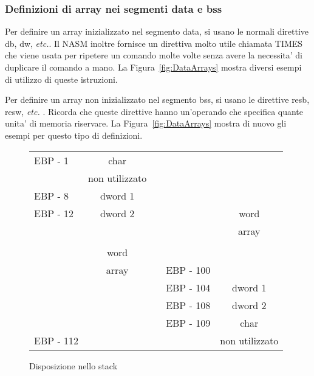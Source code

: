 \subsubsection{Definizioni di array nei segmenti {\code data} e {\code bss} 
               }

Per definire un array inizializzato nel segmento {\code data}, si usano
le normali direttive {\code db}, {\code dw}, \emph{etc.}.
Il NASM inoltre fornisce un direttiva molto utile chiamata {\code TIMES}  che viene usata per ripetere un comando molte volte
senza avere la necessita' di duplicare il comando a mano.
La Figura~\ref{fig:DataArrays} mostra diversi esempi di utilizzo di
queste istruzioni.   

Per definire un array non inizializzato nel segmento {\code bss}, si usano
le direttive {\code resb}, {\code resw}, \emph{etc.} .
Ricorda che queste direttive hanno un'operando che specifica quante
unita' di memoria riservare. La Figura~\ref{fig:DataArrays} mostra
di nuovo gli esempi per questo tipo di definizioni.

\begin{figure}[t]
\centering
\begin{tabular}{l|c|ll|c|}
\cline{2-2} \cline{5-5}
EBP - 1  & char    & \hspace{2em} &           & \\
\cline{2-2}
         & non utilizzato  &              &           & \\
\cline{2-2}
EBP - 8  & dword 1 &              &           & \\
\cline{2-2}
EBP - 12 & dword 2 &              &           & word \\
\cline{2-2}
         &         &              &           & array \\
         &         &              &           & \\
         & word    &              &           & \\
         & array   &              & EBP - 100 & \\
\cline{5-5}
         &         &              & EBP - 104 & dword 1 \\
\cline{5-5}
         &         &              & EBP - 108 & dword 2 \\
\cline{5-5}
         &         &              & EBP - 109 & char \\
\cline{5-5}
EBP - 112 &        &              &           & non utilizzato \\
\cline{2-2} \cline{5-5}
\end{tabular}
\caption{Disposizione nello stack\label{fig:StackLayouts}}
\end{figure}


